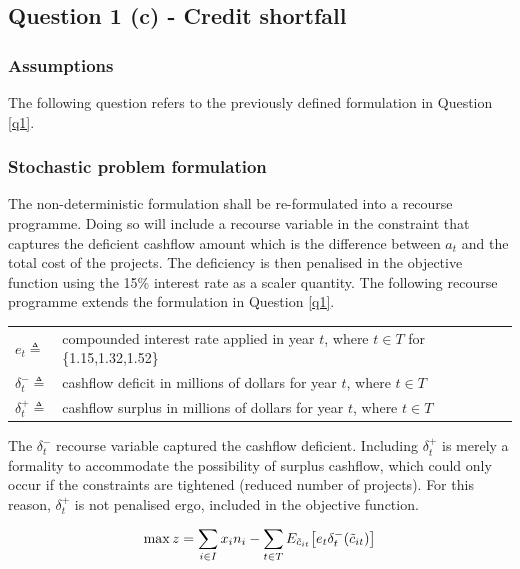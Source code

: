 \documentclass[a4paper,11pt]{article}
\begin{document}

\subsection{Question 1 (c) - Credit shortfall}

\subsubsection{Assumptions}
The following question refers to the previously defined formulation in Question \ref{q1}.

\subsubsection{Stochastic problem formulation}
The non-deterministic formulation shall be re-formulated into a recourse programme. Doing so will include a recourse variable in the constraint that captures the deficient cashflow amount which is the difference between $a_t$ and the total cost of the projects. The deficiency is then penalised in the objective function using the 15\% interest rate as a scaler quantity. The following recourse programme extends the formulation in Question \ref{q1}.


\vspace{12pt}

\begin{tabular}{ll}
$e_{t} \triangleq$ & compounded interest rate applied in year $t$, where  $t \in T$ for \{1.15,1.32,1.52\}\\
$\delta_{t}^- \triangleq$ & cashflow deficit in millions of dollars for year $t$, where $t \in T$\\
$\delta_{t}^+ \triangleq$ & cashflow surplus in millions of dollars for year $t$, where $t \in T$
\end{tabular}

\vspace{12pt}

The $\delta_{t}^-$ recourse variable captured the cashflow deficient. Including $\delta_{t}^+$ is merely a formality to accommodate the possibility of surplus cashflow, which could only occur if the constraints are tightened (reduced number of projects). For this reason, $\delta_{t}^+$ is not penalised ergo, included in the objective function.

\begin{equation}
	\max z = \sum_{i\in I} x_i n_i - \sum_{t\in T}E_{\tilde{c}_{it}} \big{[}e_t\delta^-_t(\tilde{c}_{it})\big{]}
\end{equation}
\end{document}
